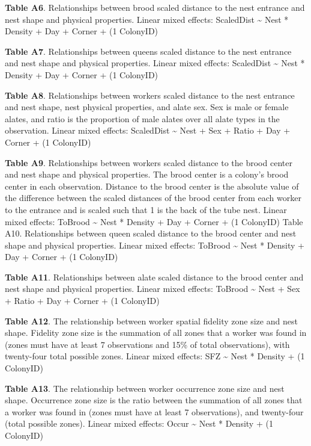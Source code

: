 \documentclass[3p]{elsarticle} %
\begin{document}
\textbf{Table A6}. Relationships between brood scaled distance to the
nest entrance and nest shape and physical properties. Linear mixed
effects: ScaledDist \textasciitilde{} Nest * Density + Day + Corner + (1
\textbar{} ColonyID)

\textbf{Table A7}. Relationships between queens scaled distance to the
nest entrance and nest shape and physical properties. Linear mixed
effects: ScaledDist \textasciitilde{} Nest * Density + Day + Corner + (1
\textbar{} ColonyID)

\textbf{Table A8}. Relationships between workers scaled distance to the
nest entrance and nest shape, nest physical properties, and alate sex.
Sex is male or female alates, and ratio is the proportion of male alates
over all alate types in the observation. Linear mixed effects:
ScaledDist \textasciitilde{} Nest + Sex + Ratio + Day + Corner + (1
\textbar{} ColonyID)

\textbf{Table A9}. Relationships between workers scaled distance to the
brood center and nest shape and physical properties. The brood center is
a colony's brood center in each observation. Distance to the brood
center is the absolute value of the difference between the scaled
distances of the brood center from each worker to the entrance and is
scaled such that 1 is the back of the tube nest. Linear mixed effects:
ToBrood \textasciitilde{} Nest * Density + Day + Corner + (1 \textbar{}
ColonyID) Table A10. Relationships between queen scaled distance to the
brood center and nest shape and physical properties. Linear mixed
effects: ToBrood \textasciitilde{} Nest * Density + Day + Corner + (1
\textbar{} ColonyID)

\textbf{Table A11}. Relationships between alate scaled distance to the
brood center and nest shape and physical properties. Linear mixed
effects: ToBrood \textasciitilde{} Nest + Sex + Ratio + Day + Corner +
(1 \textbar{} ColonyID)

\textbf{Table A12}. The relationship between worker spatial fidelity
zone size and nest shape. Fidelity zone size is the summation of all
zones that a worker was found in (zones must have at least 7
observations and 15\% of total observations), with twenty-four total
possible zones. Linear mixed effects: SFZ \textasciitilde{} Nest *
Density + (1 \textbar{} ColonyID)

\textbf{Table A13}. The relationship between worker occurrence zone size
and nest shape. Occurrence zone size is the ratio between the summation
of all zones that a worker was found in (zones must have at least 7
observations), and twenty-four (total possible zones). Linear mixed
effects: Occur \textasciitilde{} Nest * Density + (1 \textbar{}
ColonyID)
\end{document}
